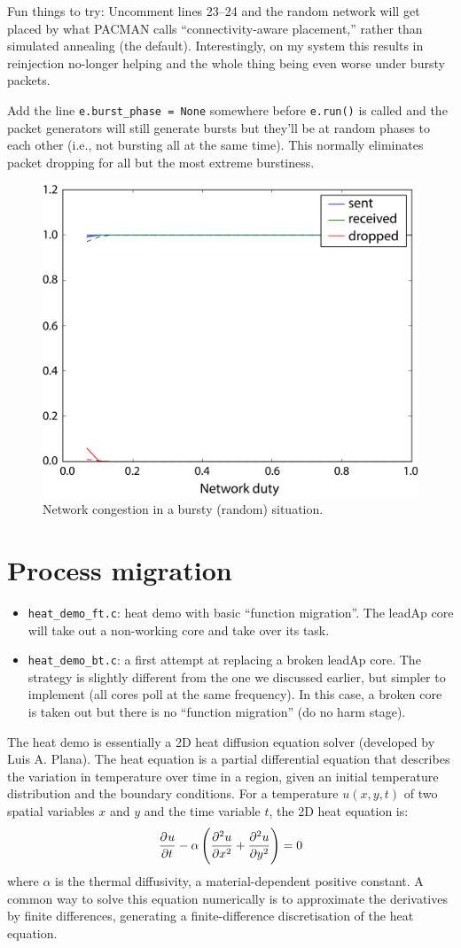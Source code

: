 \documentclass[a4paper, 11pt]{article}
\newlength\drop
\begin{document}
Fun things to try: Uncomment lines 23--24 and the random network will get placed by what PACMAN calls ``connectivity-aware placement,'' rather than simulated annealing (the default). Interestingly, on my system this results in reinjection no-longer helping and the whole thing being even worse under bursty packets.

Add the line \verb|e.burst_phase = None| somewhere before \verb|e.run()| is called and the packet generators will still generate bursts but they'll be at random phases to each other (i.e., not bursting all at the same time). This normally eliminates packet dropping for all but the most extreme burstiness.

\begin{figure}[htbp]
	\centering
	\includegraphics[width=0.5\linewidth]{images/bursting_random.pdf}
	\caption{Network congestion in a bursty (random) situation.}	
	\label{fig:bursting_random}
\end{figure}

\clearpage
\section{Process migration}

\begin{itemize}
\item \verb|heat_demo_ft.c|:  heat demo with basic ``function migration''. The leadAp core will take out a non-working core and take over its task.

\item \verb|heat_demo_bt.c|: a first attempt at replacing a broken leadAp core. The strategy is slightly different from the one we discussed earlier, but simpler to implement (all cores poll at the same frequency). In this case, a broken core is taken out but there is no ``function migration'' (do no harm stage).
\end{itemize}

The heat demo is essentially a 2D heat diffusion equation solver (developed by Luis A. Plana). The heat equation is a partial differential equation that describes the variation in temperature over time in a region, given an initial temperature distribution and the boundary conditions. For a temperature $u(x,y,t)$ of two spatial variables $x$ and $y$ and the time variable $t$, the 2D heat equation is:
\[
\dpd{u}{t} -\alpha\left( \dpd[2]{u}{x} + \dpd[2]{u}{y} \right) = 0 
\]
where $\alpha$ is the thermal diffusivity, a material-dependent positive constant. A common way to solve this equation numerically is to approximate the derivatives by finite differences, generating a finite-difference discretisation of the heat equation.
\end{document}
